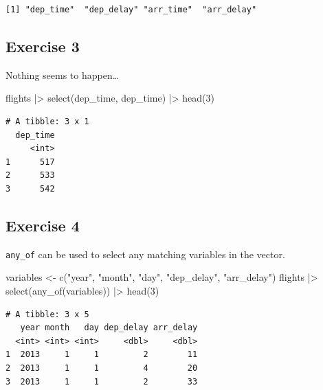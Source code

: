 \documentclass[
  letterpaper,
  DIV=11,
  numbers=noendperiod]{scrreprt}
\newenvironment{Shaded}{\begin{snugshade}}{\end{snugshade}}
\newcommand{\DecValTok}[1]{\textcolor[rgb]{0.68,0.00,0.00}{#1}}
\newcommand{\FunctionTok}[1]{\textcolor[rgb]{0.28,0.35,0.67}{#1}}
\newcommand{\NormalTok}[1]{\textcolor[rgb]{0.00,0.23,0.31}{#1}}
\newcommand{\OtherTok}[1]{\textcolor[rgb]{0.00,0.23,0.31}{#1}}
\newcommand{\SpecialCharTok}[1]{\textcolor[rgb]{0.37,0.37,0.37}{#1}}
\newcommand{\StringTok}[1]{\textcolor[rgb]{0.13,0.47,0.30}{#1}}
\begin{document}
\begin{verbatim}
[1] "dep_time"  "dep_delay" "arr_time"  "arr_delay"
\end{verbatim}

\subsection{Exercise 3}\label{exercise-3-7}

Nothing seems to happen\ldots{}

\begin{Shaded}
\begin{Highlighting}[]
\NormalTok{flights }\SpecialCharTok{|\textgreater{}}
  \FunctionTok{select}\NormalTok{(dep\_time, dep\_time) }\SpecialCharTok{|\textgreater{}}
  \FunctionTok{head}\NormalTok{(}\DecValTok{3}\NormalTok{)}
\end{Highlighting}
\end{Shaded}

\begin{verbatim}
# A tibble: 3 x 1
  dep_time
     <int>
1      517
2      533
3      542
\end{verbatim}

\subsection{Exercise 4}\label{exercise-4-7}

\texttt{any\_of} can be used to select any matching variables in the
vector.

\begin{Shaded}
\begin{Highlighting}[]
\NormalTok{variables }\OtherTok{\textless{}{-}} \FunctionTok{c}\NormalTok{(}\StringTok{"year"}\NormalTok{, }\StringTok{"month"}\NormalTok{, }\StringTok{"day"}\NormalTok{, }\StringTok{"dep\_delay"}\NormalTok{, }\StringTok{"arr\_delay"}\NormalTok{)}
\NormalTok{flights }\SpecialCharTok{|\textgreater{}}
  \FunctionTok{select}\NormalTok{(}\FunctionTok{any\_of}\NormalTok{(variables)) }\SpecialCharTok{|\textgreater{}}
  \FunctionTok{head}\NormalTok{(}\DecValTok{3}\NormalTok{)}
\end{Highlighting}
\end{Shaded}

\begin{verbatim}
# A tibble: 3 x 5
   year month   day dep_delay arr_delay
  <int> <int> <int>     <dbl>     <dbl>
1  2013     1     1         2        11
2  2013     1     1         4        20
3  2013     1     1         2        33
\end{verbatim}
\end{document}
